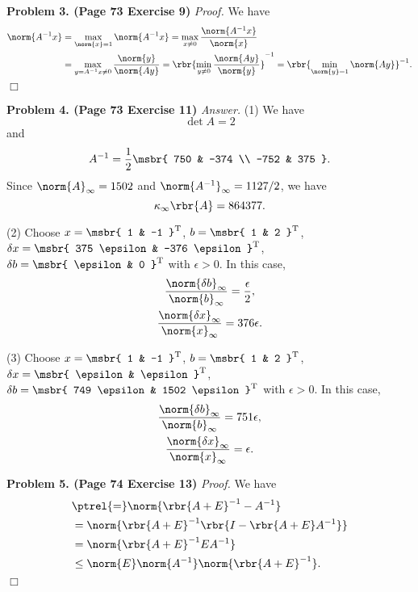 \documentclass[english, nochinese]{pnote}
\begin{document}
\textbf{Problem 3. (Page 73 Exercise 9)} \textit{Proof.} We have
\begin{equation}
\begin{split}
\norm{ A^{-1} x } &= \max_{ \norm{x} = 1 } \norm{ A^{-1} x } = \max_{ x \neq 0 } \frac{\norm{ A^{-1} x }}{\norm{x}} \\
&= \max_{ y = A^{-1} x \neq 0 }  \frac{\norm{y}}{\norm{ A y }} = \rbr{ \min_{ y \neq 0 } \frac{\norm{ A y }}{\norm{y}} }^{-1} = \rbr{ \min_{ \norm{y} = 1 } \norm{ A y } }^{-1}.
\end{split}
\end{equation}
\hfill$\Box$

\textbf{Problem 4. (Page 73 Exercise 11)} \textit{Answer.} (1) We have
\begin{equation}
\det A = 2
\end{equation}
and
\begin{equation*}
A^{-1} = \frac{1}{2} \msbr{ 750 & -374 \\ -752 & 375 }.
\end{equation*}
Since $ \norm{A}_{\infty} = 1502 $ and $ \norm{A^{-1}}_{\infty} = 1127 / 2 $, we have
\begin{equation}
\kappa_{\infty} \rbr{A} = 864377.
\end{equation}

(2) Choose $ x = \msbr{ 1 & -1 }^{\text{T}} $, $ b = \msbr{ 1 & 2 }^{\text{T}} $, $ \delta x = \msbr{ 375 \epsilon & -376 \epsilon }^{\text{T}} $, $ \delta b = \msbr{ \epsilon & 0 }^{\text{T}} $ with $ \epsilon > 0 $. In this case,
\begin{gather}
\frac{\norm{ \delta b }_{\infty}}{\norm{b}_{\infty}} = \frac{\epsilon}{2}, \\
\frac{\norm{ \delta x }_{\infty}}{\norm{x}_{\infty}} = 376 \epsilon.
\end{gather}

(3) Choose $ x = \msbr{ 1 & -1 }^{\text{T}} $, $ b = \msbr{ 1 & 2 }^{\text{T}} $, $ \delta x = \msbr{ \epsilon & \epsilon }^{\text{T}} $, $ \delta b = \msbr{ 749 \epsilon & 1502 \epsilon }^{\text{T}} $ with $ \epsilon > 0 $. In this case,
\begin{gather}
\frac{\norm{ \delta b }_{\infty}}{\norm{b}_{\infty}} = 751 \epsilon, \\
\frac{\norm{ \delta x }_{\infty}}{\norm{x}_{\infty}} = \epsilon.
\end{gather}

\textbf{Problem 5. (Page 74 Exercise 13)} \textit{Proof.} We have
\begin{equation}
\begin{split}
&\ptrel{=} \norm{ \rbr{ A + E }^{-1} - A^{-1} } \\
&= \norm{ \rbr{ A + E }^{-1} \rbr{ I - \rbr{ A + E } A^{-1} } } \\
&= \norm{ \rbr{ A + E }^{-1} E A^{-1} } \\
&\le \norm{E} \norm{A^{-1}} \norm{\rbr{ A + E }^{-1}}.
\end{split}
\end{equation}
\hfill$\Box$
\end{document}
